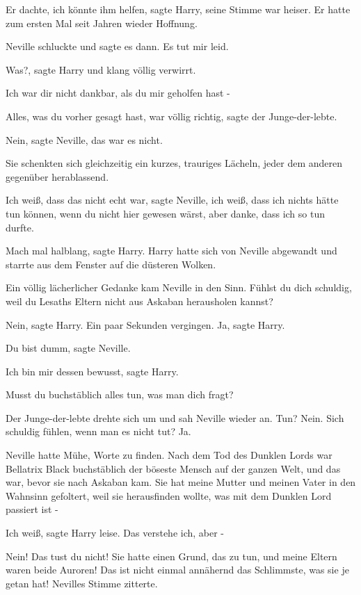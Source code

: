 \glqq Er dachte, ich könnte ihm helfen\grqq{}, sagte Harry, seine Stimme war
heiser. \glqq Er hatte zum ersten Mal seit Jahren wieder Hoffnung.\grqq{}

Neville schluckte und sagte es dann. \glqq Es tut mir leid.\grqq{}

\glqq Was?\grqq{}, sagte Harry und klang völlig verwirrt.

\glqq Ich war dir nicht dankbar, als du mir geholfen hast -\grqq{}

\glqq Alles, was du vorher gesagt hast, war völlig richtig\grqq{}, sagte der
Junge-der-lebte.

\glqq Nein\grqq{}, sagte Neville, \glqq das war es nicht.\grqq{}

Sie schenkten sich gleichzeitig ein kurzes, trauriges Lächeln, jeder dem anderen
gegenüber herablassend.

\glqq Ich weiß, dass das nicht echt war\grqq{}, sagte Neville, \glqq ich weiß,
dass ich nichts hätte tun können, wenn du nicht hier gewesen wärst, aber danke,
dass ich so tun durfte.\grqq{}

\glqq Mach mal halblang\grqq{}, sagte Harry. Harry hatte sich von Neville
abgewandt und starrte aus dem Fenster auf die düsteren Wolken.

Ein völlig lächerlicher Gedanke kam Neville in den Sinn. \glqq Fühlst du dich
schuldig, weil du Lesaths Eltern nicht aus Askaban herausholen kannst?\grqq{}

\glqq Nein\grqq{}, sagte Harry. Ein paar Sekunden vergingen. \glqq Ja\grqq{},
sagte Harry.

\glqq Du bist dumm\grqq{}, sagte Neville.

\glqq Ich bin mir dessen bewusst\grqq{}, sagte Harry.

\glqq Musst du buchstäblich alles tun, was man dich fragt?\grqq{}

Der Junge-der-lebte drehte sich um und sah Neville wieder an. \glqq Tun? Nein.
Sich schuldig fühlen, wenn man es nicht tut? Ja.\grqq{}

Neville hatte Mühe, Worte zu finden. \glqq Nach dem Tod des Dunklen Lords war
Bellatrix Black buchstäblich der böseste Mensch auf der ganzen Welt, und das
war, bevor sie nach Askaban kam. Sie hat meine Mutter und meinen Vater in den
Wahnsinn gefoltert, weil sie herausfinden wollte, was mit dem Dunklen Lord
passiert ist -\grqq{}

\glqq Ich weiß\grqq{}, sagte Harry leise. \glqq Das verstehe ich, aber -\grqq{}

\glqq Nein! Das tust du nicht! Sie hatte einen Grund, das zu tun, und meine
Eltern waren beide Auroren! Das ist nicht einmal annähernd das Schlimmste, was
sie je getan hat!\grqq{} Nevilles Stimme zitterte.

